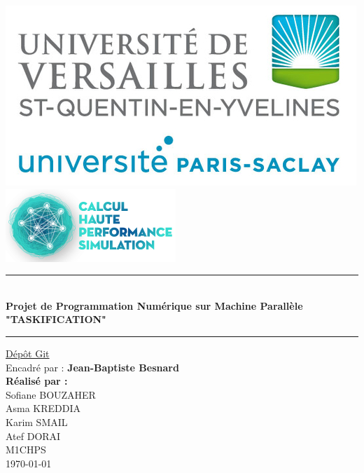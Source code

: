\documentclass[12pt,a4paper]{article}
\begin{document}

\begin{titlepage}
\newcommand{\HRule}{\rule{\linewidth}{0.1mm}}
\center

\includegraphics[scale=0.4]{logo.png} \\[0.2cm]
\includegraphics[scale=0.7]{CHPS_logo.png} 
\\[1.2cm]
\HRule \\[0.4cm]
{ \huge \bfseries Projet de Programmation Numérique sur Machine Parallèle \\ "TASKIFICATION"
  \\[0.15cm] }
\HRule 

\href{https://github.com/Taskification/Taskification}{\color{blue}Dépôt Git} 
\\[1.5cm]
Encadré par : \textbf {Jean-Baptiste Besnard } \\ [1cm]

\textbf{Réalisé par :} \\ [0.3cm] Sofiane BOUZAHER  \\ Asma  KREDDIA \\ Karim SMAIL \\ Atef DORAI 
\\[0.5cm]M1CHPS \\[5cm]
\today \\ [1cm]
\end{titlepage}

\end{document}
